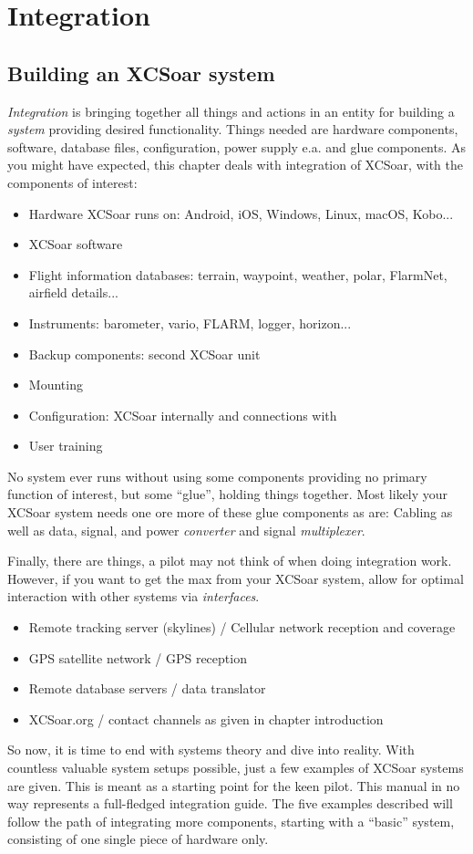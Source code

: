 \chapter{Integration}\label{cha:Integration}

\section{Building an XCSoar system}
\emph{Integration} is bringing together all things and actions in an entity for  
building a \emph{system} providing desired functionality. Things needed are 
hardware components, software, database files, configuration, power supply e.a. 
and glue components. As you might have expected, this chapter deals with 
integration of XCSoar, with the components of interest:
\begin{itemize} 
\item Hardware XCSoar runs on: Android, iOS, Windows, Linux, macOS, Kobo...
\item XCSoar software
\item Flight information databases: terrain, waypoint, weather, polar, 
FlarmNet, airfield details...
\item Instruments: barometer, vario, FLARM, logger, horizon...
\item Backup components: second XCSoar unit
\item Mounting
\item Configuration: XCSoar internally and connections with
\item User training
\end{itemize}
No system ever runs without using some components providing no primary function 
of interest, but some ``glue'', holding things together.  Most likely your XCSoar
system needs one ore more of these glue components as are:
Cabling as well as data, signal, and power \emph{converter} and signal 
\emph{multiplexer}.

Finally, there are things, a pilot may not think of when doing integration work. 
However, if you want to get the max from your XCSoar system, allow for optimal 
interaction with other systems via \emph{interfaces}.
\begin{itemize}
\item Remote tracking server (skylines) / Cellular network reception and coverage
\item GPS satellite network / GPS reception
\item Remote database servers / data translator
\item XCSoar.org / contact channels as given in chapter introduction
\end{itemize}
So now, it is time to end with systems theory and dive into reality. With
countless valuable system setups possible, just a few examples of XCSoar systems 
are given. This is meant as a starting point for the 
keen pilot. This manual in no way represents a full-fledged integration guide.
The five examples described will follow the path of integrating more components, 
starting with a ``basic'' system, consisting of one single piece of hardware only.

